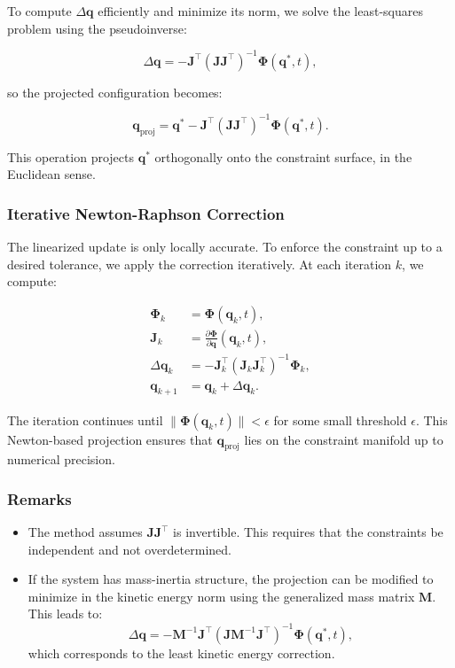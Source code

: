 \documentclass{article}
\begin{document}
To compute \( \Delta \bm{q} \) efficiently and minimize its norm, we solve the
least-squares problem using the pseudoinverse:

\begin{equation}
    \Delta \bm{q} = -\bm{J}^\top(\bm{J} \bm{J}^\top)^{-1} \bm{\Phi}(\bm{q}^*, t),
\end{equation}

so the projected configuration becomes:

\begin{equation}
    \bm{q}_{\text{proj}} = \bm{q}^* - \bm{J}^\top(\bm{J} \bm{J}^\top)^{-1} \bm{\Phi}(\bm{q}^*, t).
\end{equation}

This operation projects \( \bm{q}^* \) orthogonally onto the constraint surface,
in the Euclidean sense.

\subsubsection*{Iterative Newton-Raphson Correction}

The linearized update is only locally accurate. To enforce the constraint up to
a desired tolerance, we apply the correction iteratively. At each iteration \( k
\), we compute:

\begin{align}
    \bm{\Phi}_k &= \bm{\Phi}(\bm{q}_k, t), \\
    \bm{J}_k &= \frac{\partial \bm{\Phi}}{\partial \bm{q}} (\bm{q}_k, t), \\
    \Delta \bm{q}_k &= -\bm{J}_k^\top (\bm{J}_k \bm{J}_k^\top)^{-1} \bm{\Phi}_k, \\
    \bm{q}_{k+1} &= \bm{q}_k + \Delta \bm{q}_k.
\end{align}

The iteration continues until \( \| \bm{\Phi}(\bm{q}_k, t) \| < \epsilon \) for
some small threshold \( \epsilon \). This Newton-based projection ensures that
\( \bm{q}_{\text{proj}} \) lies on the constraint manifold up to numerical
precision.

\subsubsection*{Remarks}

\begin{itemize}
    \item The method assumes \( \bm{J} \bm{J}^\top \) is invertible. This
    requires that the constraints be independent and not overdetermined.
    \item If the system has mass-inertia structure, the projection can be
    modified to minimize in the kinetic energy norm using the generalized mass
    matrix \( \bm{M} \). This leads to:
    \[
        \Delta \bm{q} = -\bm{M}^{-1} \bm{J}^\top (\bm{J} \bm{M}^{-1} \bm{J}^\top)^{-1} \bm{\Phi}(\bm{q}^*, t),
    \]
    which corresponds to the least kinetic energy correction.
\end{itemize}
\end{document}
